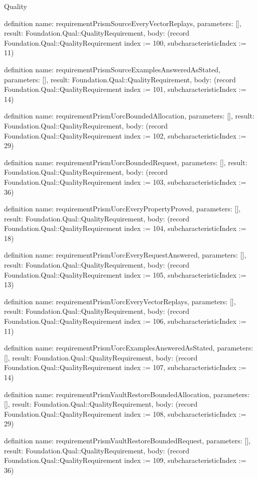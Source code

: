 \begin{lexlean}{Quality}
\begin{semanticmodule}
definition{
  name: requirementPrismSourceEveryVectorReplays,
  parameters: [],
  result: Foundation.Qual::QualityRequirement,
  body: (record Foundation.Qual::QualityRequirement {index := 100, subcharacteristicIndex := 11})
}

definition{
  name: requirementPrismSourceExamplesAnsweredAsStated,
  parameters: [],
  result: Foundation.Qual::QualityRequirement,
  body: (record Foundation.Qual::QualityRequirement {index := 101, subcharacteristicIndex := 14})
}

definition{
  name: requirementPrismUorcBoundedAllocation,
  parameters: [],
  result: Foundation.Qual::QualityRequirement,
  body: (record Foundation.Qual::QualityRequirement {index := 102, subcharacteristicIndex := 29})
}

definition{
  name: requirementPrismUorcBoundedRequest,
  parameters: [],
  result: Foundation.Qual::QualityRequirement,
  body: (record Foundation.Qual::QualityRequirement {index := 103, subcharacteristicIndex := 36})
}

definition{
  name: requirementPrismUorcEveryPropertyProved,
  parameters: [],
  result: Foundation.Qual::QualityRequirement,
  body: (record Foundation.Qual::QualityRequirement {index := 104, subcharacteristicIndex := 18})
}

definition{
  name: requirementPrismUorcEveryRequestAnswered,
  parameters: [],
  result: Foundation.Qual::QualityRequirement,
  body: (record Foundation.Qual::QualityRequirement {index := 105, subcharacteristicIndex := 13})
}

definition{
  name: requirementPrismUorcEveryVectorReplays,
  parameters: [],
  result: Foundation.Qual::QualityRequirement,
  body: (record Foundation.Qual::QualityRequirement {index := 106, subcharacteristicIndex := 11})
}

definition{
  name: requirementPrismUorcExamplesAnsweredAsStated,
  parameters: [],
  result: Foundation.Qual::QualityRequirement,
  body: (record Foundation.Qual::QualityRequirement {index := 107, subcharacteristicIndex := 14})
}

definition{
  name: requirementPrismVaultRestoreBoundedAllocation,
  parameters: [],
  result: Foundation.Qual::QualityRequirement,
  body: (record Foundation.Qual::QualityRequirement {index := 108, subcharacteristicIndex := 29})
}

definition{
  name: requirementPrismVaultRestoreBoundedRequest,
  parameters: [],
  result: Foundation.Qual::QualityRequirement,
  body: (record Foundation.Qual::QualityRequirement {index := 109, subcharacteristicIndex := 36})
}


\end{semanticmodule}
\end{lexlean}
